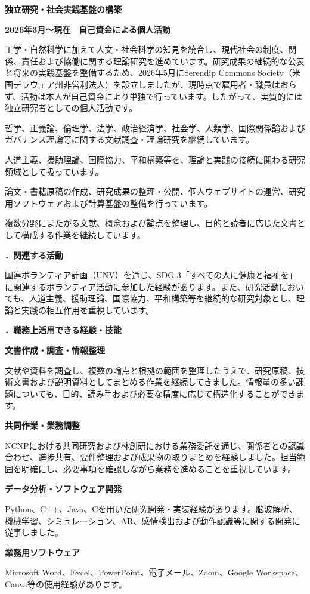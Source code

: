 \documentclass[10.5pt,a4paper]{article}
\newcommand{\MajorSection}[1]{%
  \par\vspace{0.85em}%
  {\minchofont\bfseries\fontsize{12.2pt}{15pt}\selectfont #1}\par
  \vspace{0.32em}%
}
\newcommand{\Institution}[1]{%
  \par\vspace{0.55em}%
  {\minchofont\bfseries\fontsize{11.2pt}{14pt}\selectfont #1}\par
  \vspace{0.1em}%
}
\newcommand{\RoleLine}[1]{%
  {\minchofont\bfseries #1}\par\vspace{0.08em}%
}
\begin{document}
\Institution{独立研究・社会実践基盤の構築}
\RoleLine{2026年3月～現在　自己資金による個人活動}
工学・自然科学に加えて人文・社会科学の知見を統合し、現代社会の制度、関係、責任および協働に関する理論研究を進めています。研究成果の継続的な公表と将来の実践基盤を整備するため、2026年5月にSerendip Commons Society（米国デラウェア州非営利法人）を設立しましたが、現時点で雇用者・職員はおらず、活動は本人が自己資金により単独で行っています。したがって、実質的には独立研究者としての個人活動です。

\begin{formalitems}
\item 哲学、正義論、倫理学、法学、政治経済学、社会学、人類学、国際関係論およびガバナンス理論等に関する文献調査・理論研究を継続しています。
\item 人道主義、援助理論、国際協力、平和構築等を、理論と実践の接続に関わる研究領域として扱っています。
\item 論文・書籍原稿の作成、研究成果の整理・公開、個人ウェブサイトの運営、研究用ソフトウェアおよび計算基盤の整備を行っています。
\item 複数分野にまたがる文献、概念および論点を整理し、目的と読者に応じた文書として構成する作業を継続しています。
\end{formalitems}

\MajorSection{3．関連する活動}
国連ボランティア計画（UNV）を通じ、SDG 3「すべての人に健康と福祉を」に関連するボランティア活動に参加した経験があります。また、研究活動においても、人道主義、援助理論、国際協力、平和構築等を継続的な研究対象とし、理論と実践の相互作用を重視しています。

\MajorSection{4．職務上活用できる経験・技能}

\Institution{文書作成・調査・情報整理}
文献や資料を調査し、複数の論点と根拠の範囲を整理したうえで、研究原稿、技術文書および説明資料としてまとめる作業を継続してきました。情報量の多い課題についても、目的、読み手および必要な精度に応じて構造化することができます。

\Institution{共同作業・業務調整}
NCNPにおける共同研究および林創研における業務委託を通じ、関係者との認識合わせ、進捗共有、要件整理および成果物の取りまとめを経験しました。担当範囲を明確にし、必要事項を確認しながら業務を進めることを重視しています。

\Institution{データ分析・ソフトウェア開発}
Python、C++、Java、Cを用いた研究開発・実装経験があります。脳波解析、機械学習、シミュレーション、AR、感情検出および動作認識等に関する開発に従事しました。

\Institution{業務用ソフトウェア}
Microsoft Word、Excel、PowerPoint、電子メール、Zoom、Google Workspace、Canva等の使用経験があります。
\end{document}
